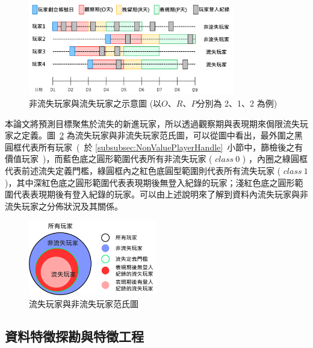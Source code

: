 \begin{figure}[!htb]
  \begin{center}
    \includegraphics[width=0.8\textwidth]{figures/Image_ClassPreparation.png}
    \caption[非流失玩家與流失玩家之示意圖]{非流失玩家與流失玩家之示意圖 (以$O$、$R$、$P$分別為 2、1、2 為例) }
    \label{fig:Image_ClassPreparation}
  \end{center}
\end{figure}

本論文將預測目標聚焦於流失的新進玩家，所以透過觀察期與表現期來侷限流失玩家之定義。圖~\ref{fig:Image_ClassVennChart} 為流失玩家與非流失玩家范氏圖，可以從圖中看出，最外圍之黑圓框代表所有玩家\ (\ 於 \ref{subsubsec:NonValuePlayerHandle}~小節中，篩檢後之有價值玩家\ )，而藍色底之圓形範圍代表所有非流失玩家 ( $class\ 0$ ) ，內圈之綠圓框代表前述流失定義門檻，綠圓框內之紅色底圓型範圍則代表所有流失玩家 ( $class\ 1$ )，其中深紅色底之圓形範圍代表表現期後無登入紀錄的玩家；淺紅色底之圓形範圍代表表現期後有登入紀錄的玩家。可以由上述說明來了解到資料內流失玩家與非流失玩家之分佈狀況及其關係。

\begin{figure}[!htb]
  \begin{center}
    \includegraphics[width=0.5\textwidth]{figures/Image_ClassVennChart.png}
    \caption[流失玩家與非流失玩家范氏圖]{流失玩家與非流失玩家范氏圖}
    \label{fig:Image_ClassVennChart}
  \end{center}
\end{figure}

\subsection{資料特徵探勘與特徵工程}
\label{subsec:FeatureMining}

